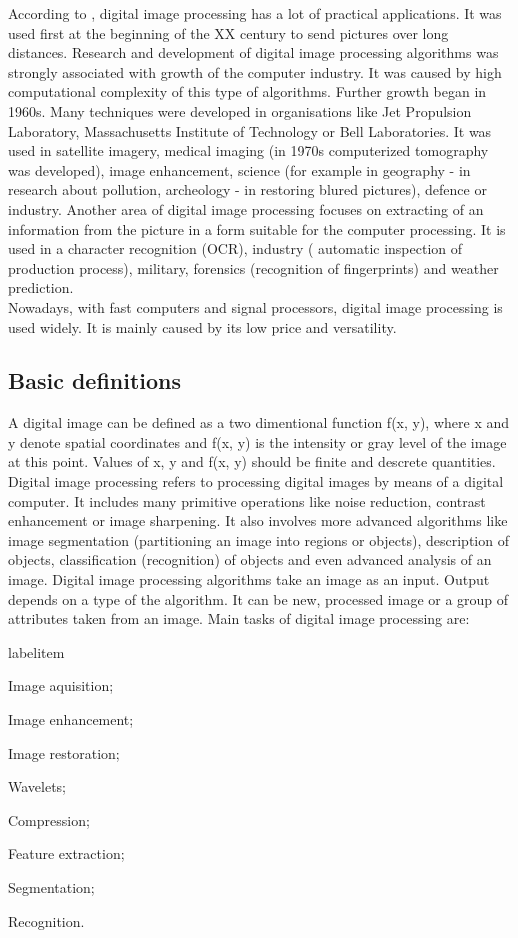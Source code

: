 \documentclass[a4paper,onecolumn,oneside,12pt]{memoir}
\makeatletter
\renewenvironment{itemize}{
  \begin{list}{  
  \csname labelitem\romannumeral\the\@listdepth\endcsname}{
  \setlength{\leftmargin}{1em}
	\setlength{\topsep}{6pt}%
	\setlength{\partopsep}{0pt}%
	\setlength{\parskip}{0pt}%
	\setlength{\parsep}{0pt}%
	\setlength{\itemsep}{0pt}}
}{
  \end{list}
}
\makeatother
\begin{document}
According to \cite{digitalImageProcessing},
digital image processing has a lot of practical applications. It was used first at the beginning of
the XX century to send pictures over long distances. Research and development of digital image
processing algorithms  was strongly associated with growth of the computer industry. It was caused
by high computational complexity of this type of algorithms. Further growth began in 1960s. Many 
techniques were developed in organisations like Jet Propulsion Laboratory, Massachusetts Institute
of Technology or Bell Laboratories. It was used in satellite imagery, medical imaging (in 1970s 
computerized tomography was developed), image enhancement, science (for example in geography - 
in research about pollution, archeology - in restoring blured pictures), defence or industry.
Another area of digital image processing focuses on extracting of an information from the picture in
a form suitable for the computer processing. It is used in a character recognition (OCR), industry (
automatic inspection of production process), military, forensics (recognition of fingerprints) and
weather prediction. \\

Nowadays, with fast computers and signal processors, digital image processing is used widely.
It is mainly caused by its low price and versatility.

\subsection{Basic definitions}

A digital image can be defined as a two dimentional function f(x, y), where x and y denote spatial 
coordinates and f(x, y) is the intensity or gray level of the image at this point. Values of x, y
and f(x, y) should be finite and descrete quantities. Digital image processing refers to processing 
digital images by means of a digital computer. It includes many primitive operations like noise
reduction, contrast enhancement or image sharpening. It also involves more advanced algorithms like
image segmentation (partitioning an image into regions or objects), description of objects,
classification (recognition) of objects and even advanced analysis of an image. Digital image 
processing algorithms take an image as an input. Output depends on a type of the algorithm.
It can be new, processed image or a group of attributes taken from an image. Main tasks of digital
image processing are:

\begin{itemize}
  \item Image aquisition;
  \item Image enhancement;
  \item Image restoration;
  \item Wavelets;
  \item Compression;
  \item Feature extraction;
  \item Segmentation;
  \item Recognition.
\end{itemize}
\end{document}
